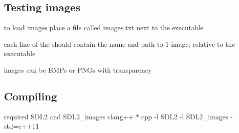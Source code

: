 \subsection*{Testing images}


\begin{DoxyItemize}
\item to load images place a file called \textquotesingle{}images.\+txt\textquotesingle{} next to the executable
\item each line of the should contain the name and path to 1 image, relative to the executable
\item images can be B\+M\+Ps or P\+N\+Gs with transparency
\end{DoxyItemize}

\subsection*{Compiling}

required S\+D\+L2 and S\+D\+L2\+\_\+images {\ttfamily clang++ $\ast$.cpp -\/l S\+D\+L2 -\/l S\+D\+L2\+\_\+images -\/std=c++11} 